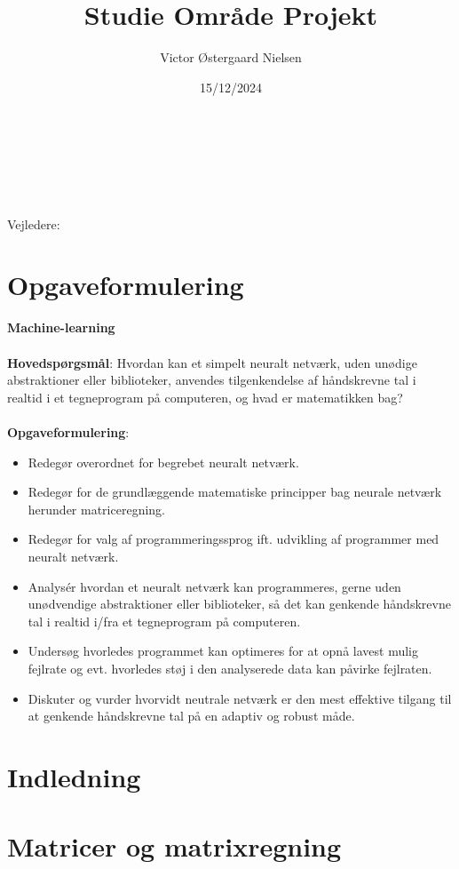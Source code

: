 \documentclass{article}
\title{\Huge{Studie Område Projekt}}
\author{Victor Østergaard Nielsen}
\date{15/12/2024}
\makeatletter
\renewcommand{\maketitle}{\bgroup\setlength{\parindent}{0pt}
\begin{flushleft}
  \textbf{\@title}

  \@subject\\\vspace{1em}
  \@author\\
  \@class\\
  \@date\\\vspace{1em}
  Vejledere:\\\@mentor
\end{flushleft}\egroup
}
\makeatother
\begin{document}
\maketitle
\newpage

\tableofcontents
\newpage

\section{Opgaveformulering}
\textbf{Machine-learning}\\\\
\textbf{Hovedspørgsmål}: Hvordan kan et simpelt neuralt netværk, uden unødige abstraktioner eller biblioteker, anvendes tilgenkendelse af håndskrevne tal i realtid i et tegneprogram på computeren, og hvad er matematikken bag?\\\\
\textbf{Opgaveformulering}:\\
\begin{itemize}
  \item Redegør overordnet for begrebet neuralt netværk.
  \item Redegør for de grundlæggende matematiske principper bag neurale netværk herunder matriceregning.
  \item Redegør for valg af programmeringssprog ift. udvikling af programmer med neuralt netværk.
  \item Analysér hvordan et neuralt netværk kan programmeres, gerne uden unødvendige abstraktioner eller biblioteker, så det kan genkende håndskrevne tal i realtid i/fra et tegneprogram på computeren.
  \item Undersøg hvorledes programmet kan optimeres for at opnå lavest mulig fejlrate og evt. hvorledes støj i den analyserede data kan påvirke fejlraten.
  \item Diskuter og vurder hvorvidt neutrale netværk er den mest effektive tilgang til at genkende håndskrevne tal på en adaptiv og robust måde.
\end{itemize}

\newpage
\section{Indledning}


\newpage
\section{Matricer og matrixregning}
\end{document}

